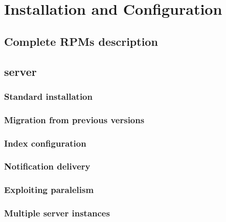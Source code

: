 \section{Installation and Configuration}
\TODO{}

\subsection{Complete RPMs description}

\subsection{\LB server}

\subsubsection{Standard installation}


\subsubsection{Migration from previous versions}


\subsubsection{Index configuration}


\subsubsection{Notification delivery}

\subsubsection{Exploiting paralelism}

\subsubsection{Multiple server instances}

